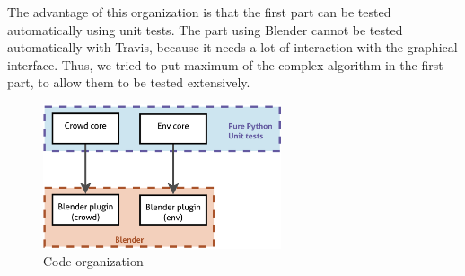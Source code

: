 The advantage of this organization is that the first part can be
tested automatically using unit tests. The part using Blender cannot
be tested automatically with Travis, because it needs a lot of
interaction with the graphical interface. Thus, we tried to put
maximum of the complex algorithm in the first part, to allow them to
be tested extensively.

\begin{figure}[h]
  \begin{center}
    \includegraphics[width=7cm]{img/orga.pdf}
    \caption{Code organization}
    \label{fig:code}
  \end{center}
\end{figure}
